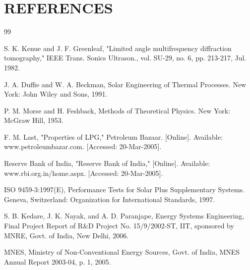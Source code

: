 \chapter*{REFERENCES}

\begin{thebibliography}{99}

S. K. Kenue and J. F. Greenleaf, "Limited angle multifrequency diffraction tomography," IEEE Trans. Sonics Ultrason., vol. SU-29, no. 6, pp. 213-217, Jul. 1982.

J. A. Duffie and W. A. Beckman, Solar Engineering of Thermal Processes. New York: John Wiley and Sons, 1991.

P. M. Morse and H. Feshback, Methods of Theoretical Physics. New York: McGraw Hill, 1953.

F. M. Last, "Properties of LPG," Petroleum Bazaar. [Online]. Available: www.petroleumbazar.com. [Accessed: 20-Mar-2005].

Reserve Bank of India, "Reserve Bank of India," [Online]. Available: www.rbi.org.in/home.aspx. [Accessed: 20-Mar-2005].

ISO 9459-3:1997(E), Performance Tests for Solar Plus Supplementary Systems. Geneva, Switzerland: Organization for International Standards, 1997.

S. B. Kedare, J. K. Nayak, and A. D. Paranjape, Energy Systems Engineering, Final Project Report of R\&D Project No. 15/9/2002-ST, IIT, sponsored by MNRE, Govt. of India, New Delhi, 2006.

MNES, Ministry of Non-Conventional Energy Sources, Govt. of India, MNES Annual Report 2003-04, p. 1, 2005.

\end{thebibliography}

\clearpage
